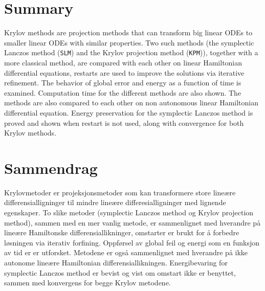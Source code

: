 \section*{Summary}
\noindent Krylov methods are projection methods that can transform big linear ODEs to smaller linear ODEs with similar properties. 
Two such methods (the symplectic Lanczos method (\texttt{SLM}) and the Krylov projection method (\texttt{KPM})), together with a more classical method, are compared with each other on linear Hamiltonian differential equations, restarts are used to improve the solutions via iterative refinement. The behavior of global error and energy as a function of time is examined. Computation time for the different methods are also shown. The methods are also compared to each other on non autonomous linear Hamiltonian differential equation.
Energy preservation for the symplectic Lanczos method is proved and shown when restart is not used, along with convergence for both Krylov methods. %


\section*{Sammendrag}
\noindent Krylovmetoder er projeksjonsmetoder som kan transformere store lineære differensialligninger til mindre lineære differesialligninger med lignende egenskaper. 
To slike metoder (symplectic Lanczos method og Krylov projection method), sammen med en mer vanlig metode, er sammenlignet med hverandre på lineære Hamiltonske differensiallikninger, omstarter er brukt for å forbedre løsningen via iterativ forfining. Oppførsel av global feil og energi som en funksjon av tid er er utforsket. Metodene er også sammenlignet med hverandre på ikke autonome lineære Hamiltonian differensiallikningen. Energibevaring for symplectic Lanczos method er bevist og vist om omstart ikke er benyttet, sammen med konvergens for begge Krylov metodene.%